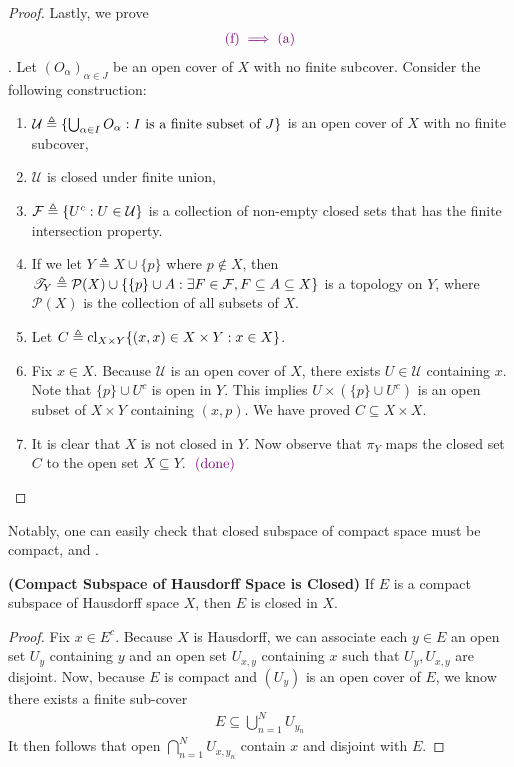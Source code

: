 \documentclass{report}
\begin{document}
\begin{proof}
Lastly, we prove 
\begin{align*}
\textcolor{violet}{(\text{f})\implies (\text{a})}
\end{align*}
. Let $(O_\alpha)_{\alpha \in J}$ be an open cover of $X$ with no finite subcover. Consider the following construction:
\begin{enumerate}[label=(\alph*)]
    \item $\mathcal{U} \triangleq \{ \bigcup_{\alpha \in I} O_\alpha : I \text{ is a finite subset of } J \}$ is an open cover of $X$ with no finite subcover,
    \item $\mathcal{U}$ is closed under finite union,
    \item $\mathcal{F} \triangleq \{ U^c : U \in \mathcal{U} \}$ is a collection of non-empty closed sets that has the finite intersection property.
    \item If we let $Y \triangleq X \cup \{p\}$ where $p \notin X$, then $\mathscr{T}_Y \triangleq \mathcal{P}(X) \cup \{ \{p\} \cup A : \exists F \in \mathcal{F}, F \subseteq A \subseteq X \}$ is a topology on $Y$, where $\mathcal{P}(X)$ is the collection of all subsets of $X$.
    \item Let $C \triangleq \operatorname{cl}_{X \times Y} \{ (x, x) \in X \times Y : x \in X \}$.
    \item Fix $x \in X$. Because $\mathcal{U}$ is an open cover of $X$, there exists $U \in \mathcal{U}$ containing $x$. Note that $\{p\} \cup U^c$ is open in $Y$. This implies $U \times (\{p\} \cup U^c)$ is an open subset of $X \times Y$ containing $(x, p)$. We have proved $C \subseteq X \times X$.
    \item It is clear that $X$ is not closed in $Y$. Now observe that $\pi_Y$ maps the closed set $C$ to the open set $X \subseteq Y$. \CaC $\textcolor{violet}{\text{ (done) }}$
\end{enumerate}
\end{proof}
\begin{mdframed}
Notably, one can easily check that closed subspace of compact space must be compact, and . 
\end{mdframed}
\begin{theorem}
\label{Compact Subspace of Hausdorff Space is Closed}
\textbf{(Compact Subspace of Hausdorff Space is Closed)} If $E$ is a compact subspace of Hausdorff space $X$, then $E$ is closed in  $X$. 
\end{theorem}
\begin{proof}
Fix $x \in E^c$. Because $X$ is Hausdorff, we can associate each $y \in E$ an open set $U_y$ containing $y$ and an open set  $U_{x,y}$ containing $x$ such that  $U_y,U_{x,y}$ are disjoint. Now, because $E$ is compact and $(U_y)$ is an open cover of $E$, we know there exists a finite sub-cover 
\begin{align*}
E\subseteq \bigcup_{n=1}^N U_{y_n} 
\end{align*}
It then follows that open $\bigcap_{n=1}^N U_{x,y_n}$ contain $x$ and disjoint with $E$. 
\end{proof}
\end{document}
